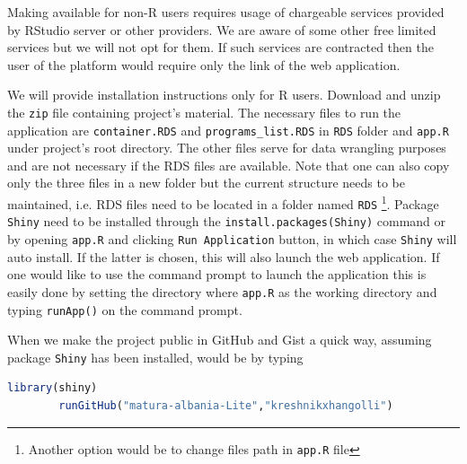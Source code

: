 \documentclass{article}
\begin{document}
Making available for non-R users requires usage of chargeable services provided by RStudio server or other providers. We are aware of some other free limited services but we will not opt for them. If such services are contracted then the user of the platform would require only the link of the web application. 

We will provide installation instructions only for R users. Download and unzip the \texttt{zip} file containing project's material. The necessary files to run the application are \texttt{container.RDS} and \texttt{programs\_list.RDS} in \texttt{RDS} folder and \texttt{app.R} under project's root directory. The other files serve for data wrangling purposes and are not necessary if the RDS files are available. Note that one can also copy only the three files in a new folder but the current structure needs to be maintained, i.e. RDS files need to be located in a folder named \texttt{RDS} \footnote{Another option would be to change files path in \texttt{app.R} file}. Package \texttt{Shiny} need to be installed through the \texttt{install.packages(Shiny)} command or by opening \texttt{app.R} and clicking \texttt{Run Application} button, in which case \texttt{Shiny} will auto install. If the latter is chosen, this will also launch the web application. If one would like to use the command prompt to launch the application this is easily done by setting the directory where \texttt{app.R} as the working directory and typing \texttt{runApp()} on the command prompt.

When we make the project public in GitHub and Gist a quick way, assuming package \texttt{Shiny} has been installed, would be by typing

 \begin{lstlisting}[language=R]
 		library(shiny)
		runGitHub("matura-albania-Lite","kreshnikxhangolli")
\end{lstlisting}



	
\end{document}
